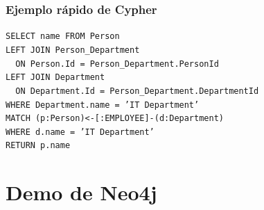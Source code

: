 \begin{frame}
\frametitle{Ejemplo rápido de Cypher}
\footnotesize

\texttt{SELECT name FROM Person					\\
	LEFT JOIN Person\_Department				\\
	~~ON Person.Id = Person\_Department.PersonId		\\
	LEFT JOIN Department					\\
	~~ON Department.Id = Person\_Department.DepartmentId	\\
	WHERE Department.name = 'IT Department'			\\
}
\vspace{5mm}
\pause
\texttt{MATCH (p:Person)<-[:EMPLOYEE]-(d:Department)		\\
	WHERE d.name = 'IT Department'				\\
	RETURN p.name
}

\end{frame}

\section{Demo de Neo4j}
